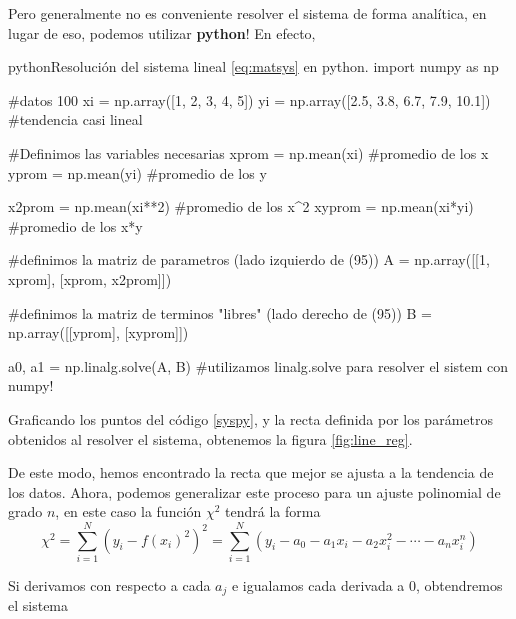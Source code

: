  Pero generalmente no es conveniente resolver el sistema de forma analítica, en lugar de eso, podemos utilizar \textbf{python}! En efecto,

 \begin{sourcecode}[\label{syspy}]{python}{Resolución del sistema lineal \eqref{eq:matsys} en python.}
import numpy as np

#datos 100%
xi = np.array([1, 2, 3, 4, 5])
yi = np.array([2.5, 3.8, 6.7, 7.9, 10.1]) #tendencia casi lineal

#Definimos las variables necesarias
xprom = np.mean(xi) #promedio de los x
yprom = np.mean(yi) #promedio de los y

x2prom = np.mean(xi**2) #promedio de los x^{2}
xyprom = np.mean(xi*yi) #promedio de los x*y

#definimos la matriz de parametros (lado izquierdo de (95))
A = np.array([[1, xprom],
             [xprom, x2prom]])

#definimos la matriz de terminos "libres" (lado derecho de (95))
B = np.array([[yprom],
             [xyprom]])

a0, a1 = np.linalg.solve(A, B) #utilizamos linalg.solve para resolver el sistem con numpy!
  \end{sourcecode}

Graficando los puntos del código \ref{syspy}, y la recta definida por los parámetros obtenidos al resolver el sistema, obtenemos la figura \ref{fig:line_reg}.


De este modo, hemos encontrado la recta que mejor se ajusta a la tendencia de los datos. Ahora, podemos generalizar este proceso para un ajuste polinomial de grado $n$, en este caso la función $\chi^{2}$ tendrá la forma
\begin{equation}
  \chi^{2} = \sum_{i=1}^{N}(y_{i} - f(x_{i})^{2})^{2} = \sum_{i=1}^{N}(y_{i} - a_{0} - a_{1}x_{i} - a_{2}x^{2}_{i} - \cdots - a_{n}x^{n}_{i})
 \end{equation}

 Si derivamos con respecto a cada $a_{j}$ e igualamos cada derivada a 0, obtendremos el sistema

